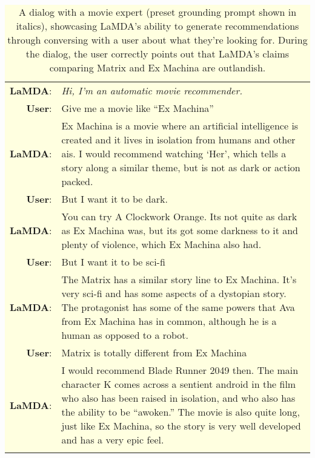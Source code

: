\documentclass{article}
\begin{document}
\begin{table}[h!]
\small
\centering
\colorbox{lightyellow}{

\begin{tabular}{rp{12cm}}
\textbf{LaMDA}: & \textit{Hi, I'm an automatic movie recommender.} \\
\textbf{User}: & Give me a movie like ``Ex Machina'' \\
\textbf{LaMDA}: & Ex Machina is a movie where an artificial intelligence is created and it lives in isolation from humans and other ais. I would recommend watching `Her', which tells a story along a similar theme, but is not as dark or action packed. \\
\textbf{User}: & But I want it to be dark. \\
\textbf{LaMDA}: & You can try A Clockwork Orange. Its not quite as dark as Ex Machina was, but its got some darkness to it and plenty of violence, which Ex Machina also had. \\
\textbf{User}: & But I want it to be sci-fi \\
\textbf{LaMDA}: & The Matrix has a similar story line to Ex Machina. It's very sci-fi and has some aspects of a dystopian story. The protagonist has some of the same powers that Ava from Ex Machina has in common, although he is a human as opposed to a robot. \\
\textbf{User}: & Matrix is totally different from Ex Machina \\
\textbf{LaMDA}: & I would recommend Blade Runner 2049 then. The main character K comes across a sentient android in the film who also has been raised in isolation, and who also has the ability to be ``awoken.'' The movie is also quite long, just like Ex Machina, so the story is very well developed and has a very epic feel. \\
\\
\end{tabular}
}
\caption{A dialog with a movie expert (preset grounding prompt shown in italics), showcasing LaMDA's ability to generate recommendations through conversing with a user about what they're looking for. During the dialog, the user correctly points out that LaMDA's claims comparing Matrix and Ex Machina are outlandish.}
\label{tab:example-conv3}
\end{table}
\end{document}
